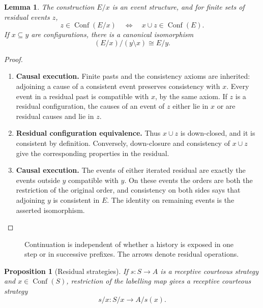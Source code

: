 \documentclass[11pt,a4paper]{article}
\numberwithin{equation}{section}
\newtheorem{proposition}[theorem]{Proposition}
\newtheorem{lemma}[theorem]{Lemma}
\theoremstyle{definition}
\theoremstyle{remark}
\theoremstyle{plain}
\begin{document}
\begin{lemma}
\label{lem:egt-residual}
The construction $E/x$ is an event structure, and for finite sets of
residual events $z$,
\[
 z\in\operatorname{Conf}(E/x)
 \quad\Longleftrightarrow\quad
 x\cup z\in\operatorname{Conf}(E).
\]
If $x\subseteq y$ are configurations, there is a canonical isomorphism
\[
 (E/x)/(y\setminus x)\cong E/y.
\]
\end{lemma}
\begin{proof}
\leavevmode
\begin{enumerate}[label=\textup{(\arabic*)},leftmargin=*,itemsep=4pt,topsep=3pt]
  \item \textbf{Causal execution.} Finite pasts and the consistency axioms are inherited: adjoining a cause
of a consistent event preserves consistency with $x$. Every event in a
residual past is compatible with $x$, by the same axiom. If $z$ is a
residual configuration, the causes of an event of $z$ either lie in $x$
or are residual causes and lie in $z$.
  \item \textbf{Residual configuration equivalence.} Thus $x\cup z$ is down-closed,
and it is consistent by definition. Conversely, down-closure and
consistency of $x\cup z$ give the corresponding properties in the
residual.
  \item \textbf{Causal execution.} The events of either iterated residual are exactly the events outside
$y$ compatible with $y$. On these events the orders are both the
restriction of the original order, and consistency on both sides says
that adjoining $y$ is consistent in $E$. The identity on remaining events
is the asserted isomorphism.
\end{enumerate}
\end{proof}

\begin{figure}[htbp]
\centering
{}
\caption{Continuation is independent of whether a history is exposed in
one step or in successive prefixes. The arrows denote residual operations.}
\end{figure}

\begin{proposition}[Residual strategies]
\label{prop:egt-residual-strategy}
If $s:S\to A$ is a receptive courteous strategy and
$x\in\operatorname{Conf}(S)$, restriction of the labelling map gives a
receptive courteous strategy
\[
 s/x:S/x\longrightarrow A/s(x).
\]
\end{proposition}
\end{document}
